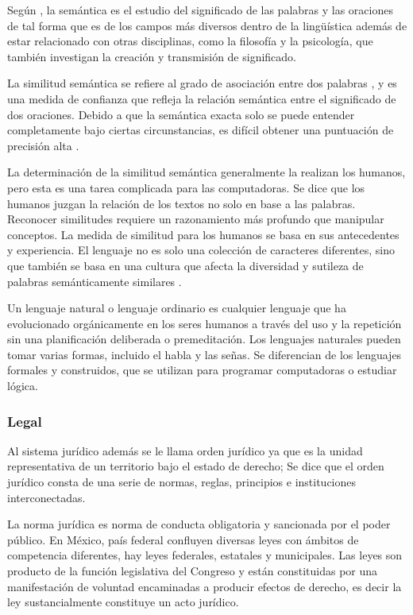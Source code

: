\documentclass[12pt]{article}
\begin{document}
		Según \cite{Saeed2011}, la semántica es el estudio del significado de las palabras y las oraciones de tal forma que es de los campos más diversos dentro de la lingüística además de estar relacionado con otras disciplinas, como la filosofía y la psicología, que también investigan la creación y transmisión de significado.		

		La similitud semántica se refiere al grado de asociación entre dos palabras \cite{Butz2011}, y es una medida de confianza que refleja la relación semántica entre el significado de dos oraciones. Debido a que la semántica exacta solo se puede entender completamente bajo ciertas circunstancias, es difícil obtener una puntuación de precisión alta \cite{Sombattheera2013}. 
			
		La determinación de la similitud semántica generalmente la realizan los humanos, pero esta es una tarea complicada para las computadoras. Se dice que los humanos juzgan la relación de los textos no solo en base a las palabras. Reconocer similitudes requiere un razonamiento más profundo que manipular conceptos. La medida de similitud para los humanos se basa en sus antecedentes y experiencia. El lenguaje no es solo una colección de caracteres diferentes, sino que también se basa en una cultura que afecta la diversidad y sutileza de palabras semánticamente similares \cite{Butz2011}.			

		Un lenguaje natural o lenguaje ordinario es cualquier lenguaje que ha evolucionado orgánicamente en los seres humanos a través del uso y la repetición sin una planificación deliberada o premeditación. Los lenguajes naturales pueden tomar varias formas, incluido el habla y las señas. Se diferencian de los lenguajes formales y construidos, que se utilizan para programar computadoras o estudiar lógica. \cite{Lyons1991}
		
		
		\subsubsection{Legal}
		Al sistema jurídico además se le llama orden jurídico ya que es la unidad representativa de un territorio bajo el estado de derecho; Se dice que el orden jurídico consta de una serie de normas, reglas, principios e instituciones interconectadas. \cite{Baron2009}
		
		La norma jurídica es norma de conducta obligatoria y sancionada por el poder público. En México, país federal confluyen diversas leyes con ámbitos de competencia diferentes, hay leyes federales, estatales y municipales. Las leyes son producto de la función legislativa del Congreso y están constituidas por una manifestación de voluntad encaminadas a producir efectos de derecho, es decir la ley sustancialmente constituye un acto jurídico. \cite{PorrasZarate2021}
\end{document}
